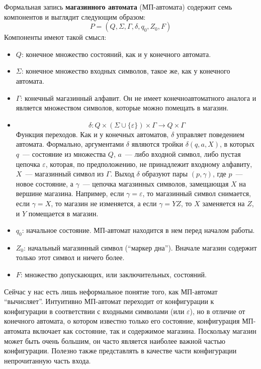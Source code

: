 \documentclass[a4paper,12pt]{article}
\begin{document}
	Формальная запись \textbf{магазинного автомата} (МП-автомата) содержит семь компонентов и выглядит следующим образом:
	\[P = (Q, \Sigma, \Gamma, \delta, q_0, Z_0, F)\]
	Компоненты имеют такой смысл:
	\begin{itemize}
		\item \(Q\): конечное множество состояний, как и у конечного автомата.
		\item \(\Sigma\): конечное множество входных символов, такое же, как у конечного автомата.
		\item \(\Gamma\): конечный магазинный алфавит. Он не имеет конечноавтоматного аналога и является множеством символов, которые можно помещать в магазин.
		\item \[\delta : Q \times (\Sigma \cup  \{\varepsilon\}) \times \Gamma \to Q \times \Gamma\] Функция переходов. Как и у конечных автоматов, \(\delta\) управляет поведением автомата. Формально, аргументами \(\delta\) являются тройки \(\delta(q, a, X)\), в которых \(q\)~--- состояние из множества \(Q\), \(a\)~--- либо входной символ, либо пустая цепочка \(\varepsilon\), которая, по предположению, не принадлежит входному алфавиту, \(X\)~--- магазинный символ из \(\Gamma\). Выход \(\delta\) образуют пары \((p, \gamma)\), где \(p\)~--- новое состояние, а \(\gamma\)~--- цепочка магазинных символов, замещающая \(X\) на вершине магазина. Например, если \(\gamma = \varepsilon\), то магазинный символ снимается, если \(\gamma = X\), то магазин не изменяется, а если \(\gamma = YZ\), то \(X\) заменяется на \(Z\), и \(Y\) помещается в магазин.
		\item \(q_0\): начальное состояние. МП-автомат находится в нем перед началом работы.
		\item \(Z_0\): начальный магазинный символ (``маркер дна''). Вначале магазин содержит только этот символ и ничего более.
		\item \(F\): множество допускающих, или заключительных, состояний.
	\end{itemize}
	Сейчас у нас есть лишь неформальное понятие того, как МП-автомат “вычисляет”. Интуитивно МП-автомат переходит от конфигурации к конфигурации в соответствии с входными символами (или \(\varepsilon\)), но в отличие от конечного автомата, о котором известно только его состояние, конфигурация МП-автомата включает как состояние, так и содержимое магазина. Поскольку магазин может быть очень большим, он часто является наиболее важной частью конфигурации. Полезно также представлять в качестве части конфигурации непрочитанную часть входа.
	
\end{document}
